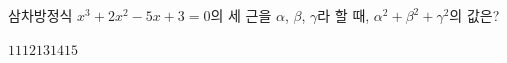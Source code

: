 삼차방정식 $x^3+2x^2-5x+3=0$의 세 근을 $\alpha$, $\beta$, $\gamma$라 할 때, $\alpha^2+\beta^2+\gamma^2$의 값은?
\begin{choices32}{$11$}{$12$}{$13$}{$14$}{$15$}\end{choices32}
